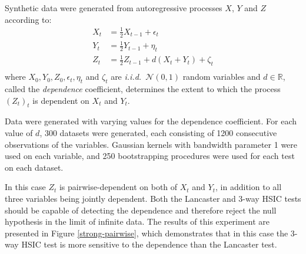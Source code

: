 \documentclass[]{article}
\begin{document}
Synthetic data were generated from autoregressive processes $X$, $Y$ and $Z$ according to:
\begin{align*}
X_t &= \frac{1}{2}X_{t-1} + \epsilon_t\\
Y_t &= \frac{1}{2}Y_{t-1} + \eta_t\\
Z_t &= \frac{1}{2}Z_{t-1} + d(X_t + Y_t) + \zeta_t\\
\end{align*}
where $X_0, Y_0, Z_0, \epsilon_t, \eta_t$ and $\zeta_t$ are \emph{i.i.d.}~$\mathcal{N}(0,1)$ random variables and $d\in\mathbb{R}$, called the \emph{dependence} coefficient, determines the extent to which the process $(Z_t)_t$ is dependent on $X_t$ and $Y_t$.

Data were generated with varying values for the dependence coefficient. For each value of $d$, 300 datasets were generated, each consisting of 1200 consecutive observations of the variables. Gaussian kernels with bandwidth parameter 1 were used on each variable, and 250 bootstrapping procedures were used for each test on each dataset.

In this case $Z_t$ is pairwise-dependent on both of $X_t$ and $Y_t$, in addition to all three variables being jointly dependent. Both the Lancaster and 3-way HSIC tests should be capable of detecting the dependence and therefore reject the null hypothesis in the limit of infinite data. The results of this experiment are presented in Figure \ref{strong-pairwise}, which demonstrates that in this case the 3-way HSIC test is more sensitive to the dependence than the Lancaster test.
\end{document}
